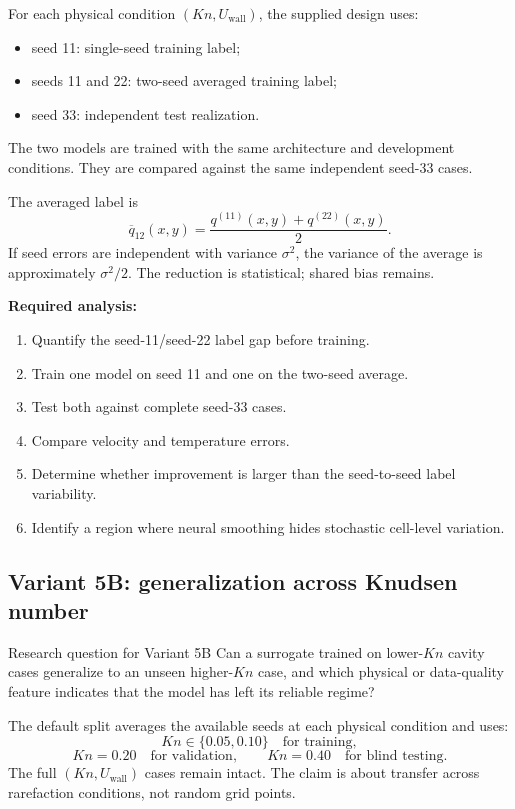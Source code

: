 \documentclass[11pt]{article}
\begin{document}
For each physical condition $(Kn,U_{\mathrm{wall}})$, the supplied design uses:
\begin{itemize}
\item seed 11: single-seed training label;
\item seeds 11 and 22: two-seed averaged training label;
\item seed 33: independent test realization.
\end{itemize}
The two models are trained with the same architecture and development conditions. They are compared against the same independent seed-33 cases.

The averaged label is
\[
\overline q_{12}(x,y)=\frac{q^{(11)}(x,y)+q^{(22)}(x,y)}{2}.
\]
If seed errors are independent with variance $\sigma^2$, the variance of the average is approximately $\sigma^2/2$. The reduction is statistical; shared bias remains.

\textbf{Required analysis:}
\begin{enumerate}
\item Quantify the seed-11/seed-22 label gap before training.
\item Train one model on seed 11 and one on the two-seed average.
\item Test both against complete seed-33 cases.
\item Compare velocity and temperature errors.
\item Determine whether improvement is larger than the seed-to-seed label variability.
\item Identify a region where neural smoothing hides stochastic cell-level variation.
\end{enumerate}

\subsection{Variant 5B: generalization across Knudsen number}
\begin{projectbox}{Research question for Variant 5B}
Can a surrogate trained on lower-$Kn$ cavity cases generalize to an unseen higher-$Kn$ case, and which physical or data-quality feature indicates that the model has left its reliable regime?
\end{projectbox}

The default split averages the available seeds at each physical condition and uses:
\[
Kn\in\{0.05,0.10\}\quad\text{for training},
\]
\[
Kn=0.20\quad\text{for validation},
\qquad
Kn=0.40\quad\text{for blind testing}.
\]
The full $(Kn,U_{\mathrm{wall}})$ cases remain intact. The claim is about transfer across rarefaction conditions, not random grid points.
\end{document}

